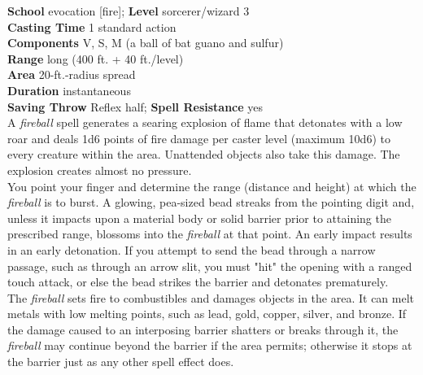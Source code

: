 \textbf{School} evocation [fire]; \textbf{Level} sorcerer/wizard 3\\
\textbf{Casting Time} 1 standard action\\
\textbf{Components} V, S, M (a ball of bat guano and sulfur)\\
\textbf{Range} long (400 ft. + 40 ft./level)\\
\textbf{Area} 20-ft.-radius spread\\
\textbf{Duration} instantaneous\\
\textbf{Saving Throw} Reflex half; \textbf{Spell Resistance} yes\\
A \textit{fireball }spell generates a searing explosion of flame that detonates with a low roar and deals 1d6 points of fire damage per caster level (maximum 10d6) to every creature within the area. Unattended objects also take this damage. The explosion creates almost no pressure.\\
You point your finger and determine the range (distance and height) at which the \textit{fireball }is to burst. A glowing, pea-sized bead streaks from the pointing digit and, unless it impacts upon a material body or solid barrier prior to attaining the prescribed range, blossoms into the \textit{fireball }at that point. An early impact results in an early detonation. If you attempt to send the bead through a narrow passage, such as through an arrow slit, you must "hit" the opening with a ranged touch attack, or else the bead strikes the barrier and detonates prematurely.\\
The \textit{fireball }sets fire to combustibles and damages objects in the area. It can melt metals with low melting points, such as lead, gold, copper, silver, and bronze. If the damage caused to an interposing barrier shatters or breaks through it, the \textit{fireball }may continue beyond the barrier if the area permits; otherwise it stops at the barrier just as any other spell effect does.\\
